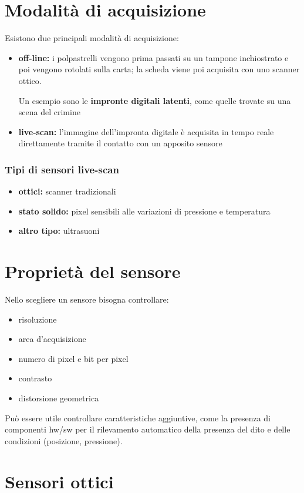 \documentclass{report}
\begin{document}
\section{Modalità di acquisizione}
Esistono due principali modalità di acquisizione:
\begin{itemize}
    \item \textbf{off-line:} i polpastrelli vengono prima passati su un tampone inchiostrato e poi 
    vengono rotolati sulla carta; la scheda viene poi acquisita con uno scanner ottico.

    Un esempio sono le \textbf{impronte digitali latenti}, come quelle trovate su una scena del crimine
    \item \textbf{live-scan:} l'immagine dell'impronta digitale è acquisita in tempo reale 
    direttamente tramite il contatto con un apposito sensore
\end{itemize}

\subsubsection{Tipi di sensori live-scan}
\begin{itemize}
    \item \textbf{ottici:} scanner tradizionali
    \item \textbf{stato solido:} pixel sensibili alle variazioni di pressione e temperatura
    \item \textbf{altro tipo:} ultrasuoni
\end{itemize}

\newpage
\section{Proprietà del sensore}

Nello scegliere un sensore bisogna controllare:
\begin{itemize}
    \item risoluzione
    \item area d'acquisizione
    \item numero di pixel e bit per pixel
    \item contrasto
    \item distorsione geometrica
\end{itemize}
Può essere utile controllare caratteristiche aggiuntive, come la presenza di componenti
hw/sw per il rilevamento automatico della presenza del dito e delle condizioni (posizione, pressione).

\section{Sensori ottici}
\end{document}
